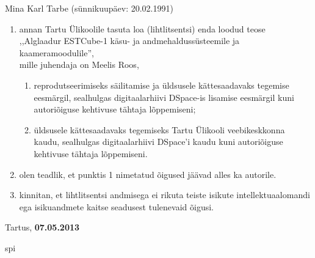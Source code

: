 \documentclass[12pt,a4paper]{article}
\begin{document}
Mina Karl Tarbe (sünnikuupäev: 20.02.1991)
\begin{enumerate}
	\item
		annan Tartu Ülikoolile tasuta loa (lihtlitsentsi) enda loodud teose\\
		,,Alglaadur ESTCube-1 käsu- ja andmehaldussüsteemile ja
		kaameramoodulile'',\\
		mille juhendaja on Meelis Roos,
		\begin{enumerate}
			\item 
				reprodutseerimiseks säilitamise ja üldsusele kättesaadavaks
				tegemise eesmärgil, sealhulgas digitaalarhiivi DSpace-is
				lisamise eesmärgil kuni autoriõiguse kehtivuse tähtaja
				lõppemiseni;
			\item
				üldsusele kättesaadavaks tegemiseks Tartu Ülikooli
				veebikeskkonna kaudu, sealhulgas digitaalarhiivi DSpace'i kaudu
				kuni autoriõiguse kehtivuse tähtaja lõppemiseni.
		\end{enumerate}
	\item
		olen teadlik, et punktis 1 nimetatud õigused jäävad alles ka autorile.
	\item
		kinnitan, et lihtlitsentsi andmisega ei rikuta teiste isikute
		intellektuaalomandi ega isikuandmete kaitse seadusest tulenevaid õigusi.
\end{enumerate}

Tartus, \textbf{07.05.2013}


\gls{spi}
\end{document}
